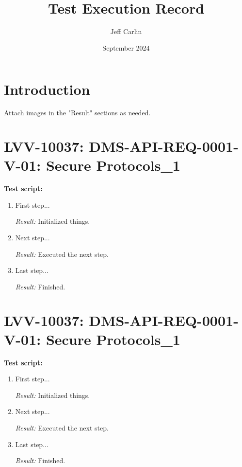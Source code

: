 \documentclass{article}
\title{Test Execution Record}
\author{Jeff Carlin}
\date{September 2024}
\begin{document}
\maketitle

\section{Introduction}

Attach images in the "Result" sections as needed.

\section{LVV-10037: DMS-API-REQ-0001-V-01: Secure Protocols\_1}\label{LVV-10037}

\textbf{Test script:}
\begin{enumerate}
    \item First step...

    \textit{Result:} Initialized things.
    
    \item Next step...

    \textit{Result:} Executed the next step.

    \item Last step...

    \textit{Result:} Finished.

\end{enumerate}

\section{LVV-10037: DMS-API-REQ-0001-V-01: Secure Protocols\_1}\label{LVV-10037}

\textbf{Test script:}
\begin{enumerate}
    \item First step...

    \textit{Result:} Initialized things.
    
    \item Next step...

    \textit{Result:} Executed the next step.

    \item Last step...

    \textit{Result:} Finished.

\end{enumerate}
\end{document}
